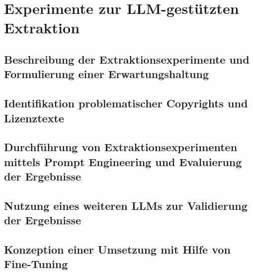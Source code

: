 \chapter{Experimente zur LLM-gestützten Extraktion}\label{ch:prompt-engineering}

\section{Beschreibung der Extraktionsexperimente und Formulierung einer
Erwartungshaltung}

\section{Identifikation problematischer Copyrights und Lizenztexte}

\section{Durchführung von Extraktionsexperimenten mittels Prompt Engineering und
Evaluierung der Ergebnisse}

\section{Nutzung eines weiteren LLMs zur Validierung der Ergebnisse}

\section{Konzeption einer Umsetzung mit Hilfe von Fine-Tuning}

